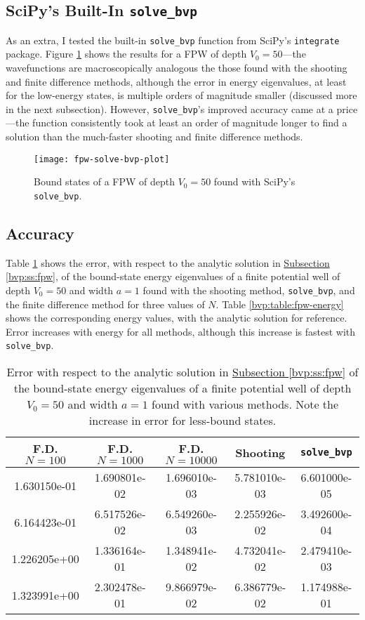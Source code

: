 \documentclass[11pt, a4paper]{article}
\begin{document}
\subsection{SciPy's Built-In \texttt{solve\_bvp}}
As an extra, I tested the built-in \texttt{solve\_bvp} function from SciPy's \texttt{integrate} package. Figure \ref{bvp:fig:fpw-solve-bvp-plot} shows the results for a FPW of depth $ V_{0} = 50 $---the wavefunctions are macroscopically analogous the those found with the shooting and finite difference methods, although the error in energy eigenvalues, at least for the low-energy states, is multiple orders of magnitude smaller (discussed more in the next subsection). However, \texttt{solve\_bvp}'s improved accuracy came at a price---the function consistently took at least an order of magnitude longer to find a solution than the much-faster shooting and finite difference methods. 

\begin{figure}
\centering
\texttt{[image: fpw-solve-bvp-plot]}
\caption{Bound states of a FPW of depth $ V_{0} = 50 $ found with SciPy's \texttt{solve\_bvp}.}
\label{bvp:fig:fpw-solve-bvp-plot}
\end{figure}


\subsection{Accuracy}
Table \ref{bvp:table:fpw-error} shows the error, with respect to the analytic solution in \hyperref[bvp:ss:fpw]{Subsection \ref{bvp:ss:fpw}}, of the bound-state energy eigenvalues of a finite potential well of depth $ V_{0} = 50 $ and width $ a = 1 $ found with the shooting method, \texttt{solve\_bvp}, and the finite difference method for three values of $ N $. Table \ref{bvp:table:fpw-energy} shows the corresponding energy values, with the analytic solution for reference.  Error increases with energy for all methods, although this increase is fastest with \texttt{solve\_bvp}.

\begin{table}[htb!]
\centering

    \begin{tabular}{c|c|c|c|c}
         F.D. $ N = 100 $ &   F.D. $ N = 1000 $ &   F.D. $ N = 10000 $ &  Shooting &  \texttt{solve\_bvp} \\
        \hline
        1.630150e-01 & 1.690801e-02 & 1.696010e-03 & 5.781010e-03 & 6.601000e-05\\
        6.164423e-01 & 6.517526e-02 & 6.549260e-03 & 2.255926e-02 & 3.492600e-04\\
        1.226205e+00 & 1.336164e-01 & 1.348941e-02 & 4.732041e-02 & 2.479410e-03\\
        1.323991e+00 & 2.302478e-01 & 9.866979e-02 & 6.386779e-02 & 1.174988e-01
	\end{tabular}
	\caption{Error with respect to the analytic solution in \hyperref[bvp:ss:fpw]{Subsection \ref{bvp:ss:fpw}} of the bound-state energy eigenvalues of a finite potential well of depth $ V_{0} = 50 $ and width $ a = 1 $ found with various methods.  Note the increase in error for less-bound states.}
	\label{bvp:table:fpw-error}
\end{table}
\end{document}
